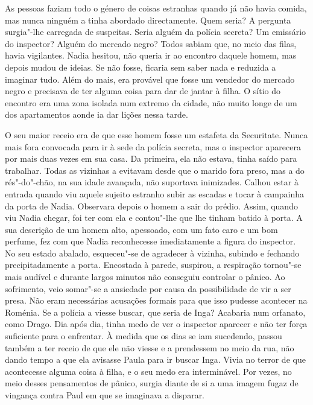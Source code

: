 As pessoas faziam todo o género de coisas estranhas quando já não havia
comida, mas nunca ninguém a tinha abordado directamente. Quem seria? A
pergunta surgia"-lhe carregada de suspeitas. Seria alguém da polícia secreta? Um
emissário do inspector? Alguém do mercado
negro? Todos sabiam que, no meio das filas, havia vigilantes. Nadia
hesitou, não queria ir ao encontro daquele homem, mas depois mudou de
ideias. Se não fosse, ficaria sem saber nada e reduzida a imaginar tudo.
Além do mais, era provável que fosse um vendedor do mercado negro e
precisava de ter alguma coisa para dar de jantar à filha. O sítio do
encontro era uma zona isolada num extremo da cidade, não muito longe de
um dos apartamentos aonde ia dar lições nessa tarde.

O seu maior receio era de que esse homem fosse um estafeta da
Securitate. Nunca mais fora convocada para ir à sede da polícia secreta,
mas o inspector aparecera por mais duas vezes em sua casa. Da primeira,
ela não estava, tinha saído para trabalhar. Todas as vizinhas a evitavam
desde que o marido fora preso, mas a do rés"-do"-chão, na sua idade
avançada, não suportava inimizades. Calhou estar à entrada quando viu
aquele sujeito estranho subir as escadas e tocar à campainha da porta de
Nadia. Observara depois o homem a sair do prédio. Assim, quando viu
Nadia chegar, foi ter com ela e contou"-lhe que lhe tinham batido à
porta. A sua descrição de um homem alto, apessoado, com um fato caro e
um bom perfume, fez com que Nadia reconhecesse imediatamente a figura do
inspector. No seu estado abalado, esqueceu"-se de agradecer à vizinha,
subindo e fechando precipitadamente a porta. Encostada à parede,
suspirou, a respiração tornou"-se mais audível e durante largos minutos
não conseguiu controlar o pânico. Ao sofrimento, veio somar"-se a
ansiedade por causa da possibilidade de vir a ser presa. Não eram
necessárias acusações formais para que isso pudesse acontecer na
Roménia. Se a polícia a viesse buscar, que seria de Inga? Acabaria num
orfanato, como Drago. Dia após dia, tinha medo de ver o inspector
aparecer e não ter força suficiente para o enfrentar. À medida que os
dias se iam sucedendo, passou também a ter receio de que ele não viesse
e a prendessem no meio da rua, não dando tempo a que ela avisasse
Paula para ir buscar Inga. Vivia no terror de que acontecesse alguma
coisa à filha, e o seu medo era interminável. Por vezes, no meio
desses pensamentos de pânico, surgia diante de si a uma imagem fugaz de
vingança contra Paul em que se imaginava a disparar.

